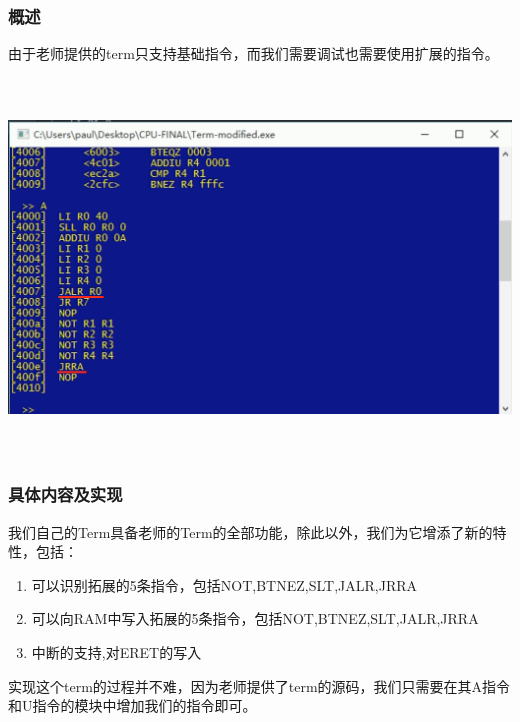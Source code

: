 \subsubsection{概述}
由于老师提供的term只支持基础指令，而我们需要调试也需要使用扩展的指令。

\begin{center}
    \includegraphics[height=10cm]{image/extension/term}
    \label{fig:term}
\end{center}

\subsubsection{具体内容及实现}
我们自己的Term具备老师的Term的全部功能，除此以外，我们为它增添了新的特性，包括：
\begin{enumerate}
    \item 可以识别拓展的5条指令，包括NOT,BTNEZ,SLT,JALR,JRRA
    \item 可以向RAM中写入拓展的5条指令，包括NOT,BTNEZ,SLT,JALR,JRRA
    \item 中断的支持,对ERET的写入
\end{enumerate}

实现这个term的过程并不难，因为老师提供了term的源码，我们只需要在其A指令和U指令的模块中增加我们的指令即可。


